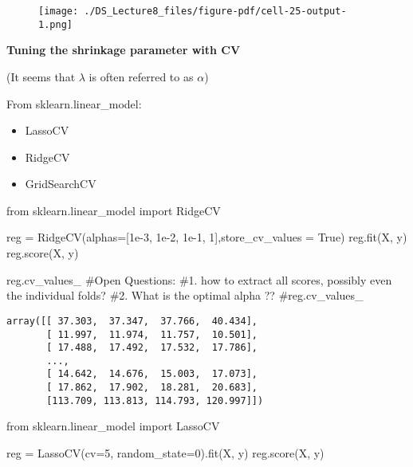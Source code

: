 \documentclass[
  letterpaper,
  DIV=11,
  numbers=noendperiod]{scrreprt}
\newenvironment{Shaded}{\begin{snugshade}}{\end{snugshade}}
\newcommand{\CommentTok}[1]{\textcolor[rgb]{0.37,0.37,0.37}{#1}}
\newcommand{\DecValTok}[1]{\textcolor[rgb]{0.68,0.00,0.00}{#1}}
\newcommand{\FloatTok}[1]{\textcolor[rgb]{0.68,0.00,0.00}{#1}}
\newcommand{\ImportTok}[1]{\textcolor[rgb]{0.00,0.46,0.62}{#1}}
\newcommand{\NormalTok}[1]{\textcolor[rgb]{0.00,0.23,0.31}{#1}}
\newcommand{\OperatorTok}[1]{\textcolor[rgb]{0.37,0.37,0.37}{#1}}
\newcommand{\VariableTok}[1]{\textcolor[rgb]{0.07,0.07,0.07}{#1}}
\providecommand{\tightlist}{%
  \setlength{\itemsep}{0pt}\setlength{\parskip}{0pt}}\usepackage{longtable,booktabs,array}
\begin{document}
\begin{figure}[H]

{\centering \texttt{[image: ./DS\_Lecture8\_files/figure-pdf/cell-25-output-1.png]}

}

\end{figure}

\textbf{Tuning the shrinkage parameter with CV}

(It seems that \(\lambda\) is often referred to as \(\alpha\))

From sklearn.linear\_model:

\begin{itemize}
\tightlist
\item
  LassoCV
\item
  RidgeCV
\item
  GridSearchCV
\end{itemize}

\begin{Shaded}
\begin{Highlighting}[]
\ImportTok{from}\NormalTok{ sklearn.linear\_model }\ImportTok{import}\NormalTok{ RidgeCV}

\NormalTok{reg }\OperatorTok{=}\NormalTok{ RidgeCV(alphas}\OperatorTok{=}\NormalTok{[}\FloatTok{1e{-}3}\NormalTok{, }\FloatTok{1e{-}2}\NormalTok{, }\FloatTok{1e{-}1}\NormalTok{, }\DecValTok{1}\NormalTok{],store\_cv\_values }\OperatorTok{=} \VariableTok{True}\NormalTok{)}
\NormalTok{reg.fit(X, y)}
\NormalTok{reg.score(X, y)}

\NormalTok{reg.cv\_values\_}
\CommentTok{\#Open Questions: }
\CommentTok{\#1. how to extract all scores, possibly even the individual folds?}
\CommentTok{\#2. What is the optimal alpha ??}
\CommentTok{\#reg.cv\_values\_}
\end{Highlighting}
\end{Shaded}

\begin{verbatim}
array([[ 37.303,  37.347,  37.766,  40.434],
       [ 11.997,  11.974,  11.757,  10.501],
       [ 17.488,  17.492,  17.532,  17.786],
       ...,
       [ 14.642,  14.676,  15.003,  17.073],
       [ 17.862,  17.902,  18.281,  20.683],
       [113.709, 113.813, 114.793, 120.997]])
\end{verbatim}

\begin{Shaded}
\begin{Highlighting}[]
\ImportTok{from}\NormalTok{ sklearn.linear\_model }\ImportTok{import}\NormalTok{ LassoCV}

\NormalTok{reg }\OperatorTok{=}\NormalTok{ LassoCV(cv}\OperatorTok{=}\DecValTok{5}\NormalTok{, random\_state}\OperatorTok{=}\DecValTok{0}\NormalTok{).fit(X, y)}
\NormalTok{reg.score(X, y)}
\end{Highlighting}
\end{Shaded}
\end{document}
